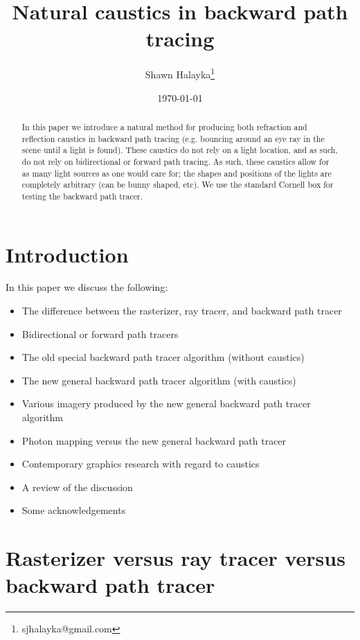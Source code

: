 \documentclass[12pt]{article}
\title{Natural caustics in backward path tracing}
\author{
Shawn Halayka\footnote{sjhalayka@gmail.com}
}
\date{\today\;\currenttime}
\begin{document}
\newcommand{\abs}[1]{\lvert#1\rvert}



\maketitle




\begin{abstract}
In this paper we introduce a natural method for producing both refraction and reflection caustics in backward path tracing (e.g. bouncing around an eye ray in the scene until a light is found).
These caustics do not rely on a light location, and as such, do not rely on bidirectional or forward path tracing.
As such, these caustics allow for as many light sources as one would care for; the shapes and positions of the lights are completely arbitrary (can be bunny shaped, etc).
We use the standard Cornell box for testing the backward path tracer.
\end{abstract}



\section{Introduction}

In this paper we discuss the following:
\begin{itemize}
\item The difference between the rasterizer, ray tracer, and backward path tracer
\item Bidirectional or forward path tracers
\item The old special backward path tracer algorithm (without caustics)
\item The new general backward path tracer algorithm (with caustics)
\item Various imagery produced by the new general backward path tracer algorithm
\item Photon mapping versus the new general backward path tracer
\item Contemporary graphics research with regard to caustics
\item A review of the discussion
\item Some acknowledgements
\end{itemize}




\section{Rasterizer versus ray tracer versus backward path tracer}
\end{document}
